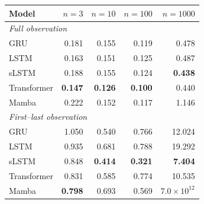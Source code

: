 \begin{tabular}{lrrrr}
\toprule
Model & $n{=}3$ & $n{=}10$ & $n{=}100$ & $n{=}1000$ \\
\midrule
\multicolumn{5}{l}{\emph{Full observation}} \\
GRU & 0.181 & 0.155 & 0.119 & 0.478 \\
LSTM & 0.163 & 0.151 & 0.125 & 0.487 \\
sLSTM & 0.188 & 0.155 & 0.124 & \textbf{0.438} \\
Transformer & \textbf{0.147} & \textbf{0.126} & \textbf{0.100} & 0.440 \\
Mamba & 0.222 & 0.152 & 0.117 & 1.146 \\
\midrule
\multicolumn{5}{l}{\emph{First--last observation}} \\
GRU & 1.050 & 0.540 & 0.766 & 12.024 \\
LSTM & 0.935 & 0.681 & 0.788 & 19.292 \\
sLSTM & 0.848 & \textbf{0.414} & \textbf{0.321} & \textbf{7.404} \\
Transformer & 0.831 & 0.585 & 0.774 & 10.535 \\
Mamba & \textbf{0.798} & 0.693 & 0.569 & $7.0\!\times\!10^{12}$ \\
\bottomrule
\end{tabular}
